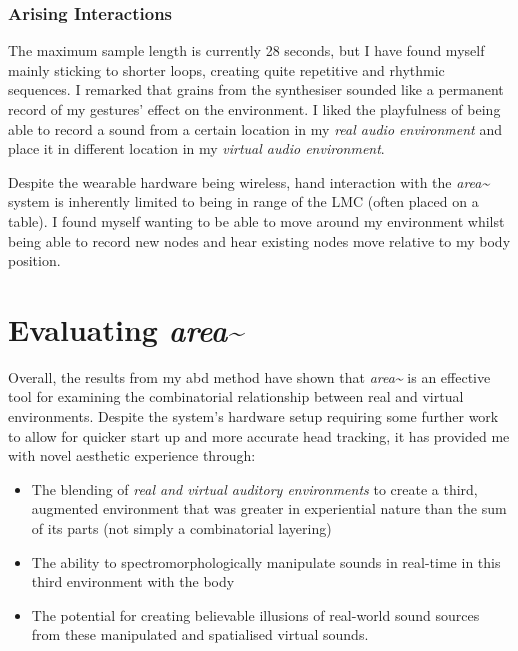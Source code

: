 \subsubsection{Arising Interactions}\label{sec: area-study-results-arisingints}
The maximum sample length is currently 28 seconds, but I have found myself mainly sticking to shorter loops, creating quite repetitive and rhythmic sequences. I remarked that grains from the synthesiser sounded like a permanent record of my gestures' effect on the environment. I liked the playfulness of being able to record a sound from a certain location in my \textit{real audio environment} and place it in different location in my \textit{virtual audio environment}.

Despite the wearable hardware being wireless, hand interaction with the \textit{area\textasciitilde{}} system is inherently limited to being in range of the LMC (often placed on a table). I found myself wanting to be able to move around my environment whilst being able to record new nodes and hear existing nodes move relative to my body position.
\section{Evaluating \textit{area\textasciitilde{}}}\label{sec: area-discussion-aar}
Overall, the results from my \gls{abd} method have shown that \textit{area\textasciitilde{}} is an effective tool for examining the combinatorial relationship between real and virtual environments. Despite the system's hardware setup requiring some further work to allow for quicker start up and more accurate head tracking, it has provided me with novel aesthetic experience through:
\begin{itemize}
    \item The blending of \textit{real and virtual auditory environments} to create a third, augmented environment that was greater in experiential nature than the sum of its parts (not simply a combinatorial layering)
    \item The ability to spectromorphologically manipulate sounds in real-time in this third environment with the body
    \item The potential for creating believable illusions of real-world sound sources from these manipulated and spatialised virtual sounds.
\end{itemize}

